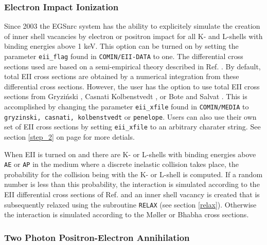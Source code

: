 \subsubsection{Electron Impact Ionization}
\label{discrete_eii}
\setcounter{equation}{0}

Since 2003 the EGSnrc system has the ability to explicitely 
simulate the creation of inner shell vacancies by electron or positron 
impact for all K- and L-shells with binding energies above 1 keV. 
This option can be turned on by setting the parameter {\tt eii\_flag} found 
in {\tt COMIN/EII-DATA} to one. The differential cross sections used are 
based on a semi-empirical theory described in Ref. \cite{Ka02b}. By default, 
total EII cross sections are obtained by a numerical integration from these 
differential cross sections. However, the user has the option to use 
total EII cross sections from Gryzi\'{n}ski \cite{Gr65a}, Casnati \cite{Ca82}
Kolbenstvedt \cite{Ko67}, or Bote and Salvat \cite{BS08}. 
This is accomplished by changing the parameter 
{\tt eii\_xfile} found in {\tt COMIN/MEDIA} to {\tt gryzinski, casnati, kolbenstvedt} or {\tt penelope}. Users can also use their own
set of EII cross sections by setting 
{\tt eii\_xfile} to an arbitrary charater string.
See section \ref{step_2} on page \pageref{eii_xfile_description} 
for more detials.

When EII is turned on and there are K- or L-shells with 
binding energies above {\tt AE} or {\tt AP} in the medium where a discrete 
inelastic collision takes place, the probability for the collision being 
with the K- or L-shell is computed. If a random number is less than this probability, 
the interaction is simulated according to the EII differential cross sections of 
Ref. \cite{Ka02b} and an inner shell vacancy is created that is subsequently relaxed 
using the subroutine {\tt RELAX} (see section \ref{relax}). Otherwise the 
interaction is simulated according to the M{\o}ller or Bhabha cross sections. 

\subsubsection{Two Photon Positron-Electron Annihilation}
\setcounter{equation}{0}
\label{annihilation}

